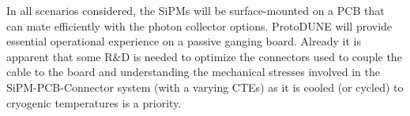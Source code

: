 In all scenarios considered, the SiPMs will be surface-mounted on a PCB that can mate efficiently with the photon
collector options. ProtoDUNE will provide essential operational experience on a passive ganging board. Already it is apparent that  some R$\&$D is needed to optimize the connectors used to couple the cable to the board and understanding the 
mechanical stresses involved in the SiPM-PCB-Connector system (with a varying CTEs) as it
is cooled (or cycled) to cryogenic temperatures is a priority.










